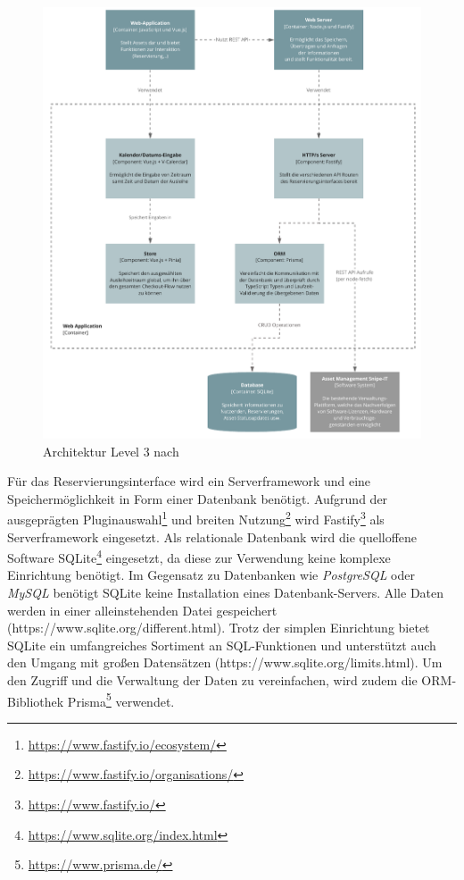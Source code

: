\begin{figure}[h]
    \centering
    \includegraphics[scale=0.9]{Bilder/C4_3.pdf}
    \caption[Architektur Level 3]{Architektur Level 3 nach
        }
    \label{fig:level3}
\end{figure}

Für das Reservierungsinterface wird ein Serverframework und eine
Speichermöglichkeit in Form einer Datenbank benötigt. Aufgrund der ausgeprägten
Pluginauswahl\footnote{\url{https://www.fastify.io/ecosystem/}} und breiten
Nutzung\footnote{\url{https://www.fastify.io/organisations/}} wird
Fastify\footnote{\url{https://www.fastify.io/}} als Serverframework eingesetzt.
Als relationale Datenbank wird die quelloffene Software
SQLite\footnote{\url{https://www.sqlite.org/index.html}} eingesetzt, da diese
zur Verwendung keine komplexe Einrichtung benötigt. Im Gegensatz zu Datenbanken
wie \textit{PostgreSQL} oder \textit{MySQL} benötigt SQLite keine Installation
eines Datenbank-Servers. Alle Daten werden in einer alleinstehenden Datei
gespeichert (https://www.sqlite.org/different.html). Trotz der simplen
Einrichtung bietet SQLite ein umfangreiches Sortiment an SQL-Funktionen und
unterstützt auch den Umgang mit großen Datensätzen
(https://www.sqlite.org/limits.html). Um den Zugriff und die Verwaltung der
Daten zu vereinfachen, wird zudem die ORM-Bibliothek
Prisma\footnote{\url{https://www.prisma.de/}} verwendet.


